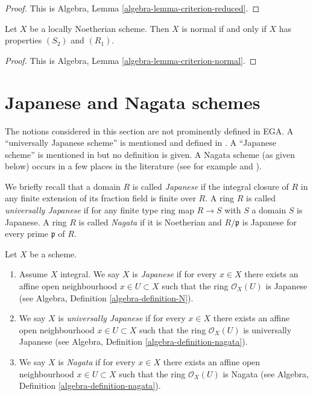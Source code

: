 \begin{proof}
This is Algebra, Lemma \ref{algebra-lemma-criterion-reduced}.
\end{proof}

\begin{lemma}
\label{lemma-criterion-normal}
Let $X$ be a locally Noetherian scheme.
Then $X$ is normal if and only if $X$ has properties $(S_2)$ and $(R_1)$.
\end{lemma}

\begin{proof}
This is Algebra, Lemma \ref{algebra-lemma-criterion-normal}.
\end{proof}






\section{Japanese and Nagata schemes}
\label{section-nagata}

\noindent
The notions considered in this section are not prominently defined in EGA.
A ``universally Japanese scheme'' is mentioned and defined in
\cite[IV Corollary 5.11.4]{EGA}. A ``Japanese scheme'' is mentioned in
\cite[IV Remark 10.4.14 (ii)]{EGA} but no definition is given.
A Nagata scheme (as given below) occurs in a few
places in the literature (see for example \cite[Definition 8.2.30]{Liu} and
\cite[Page 142]{Greco}).

\medskip\noindent
We briefly recall that a domain $R$ is called {\it Japanese} if the integral
closure of $R$ in any finite extension of its fraction field is finite over
$R$. A ring $R$ is called {\it universally Japanese} if for any finite type
ring map $R \to S$ with $S$ a domain $S$ is Japanese. A ring $R$ is called
{\it Nagata} if it is Noetherian and $R/\mathfrak p$ is Japanese for every
prime $\mathfrak p$ of $R$.

\begin{definition}
\label{definition-nagata}
Let $X$ be a scheme.
\begin{enumerate}
\item Assume $X$ integral. We say $X$ is {\it Japanese}
if for every $x \in X$ there exists an
affine open neighbourhood $x \in U \subset X$ such that the ring
$\mathcal{O}_X(U)$ is Japanese (see
Algebra, Definition \ref{algebra-definition-N}).
\item We say $X$ is {\it universally Japanese} if for every $x \in X$
there exists an affine open neighbourhood $x \in U \subset X$ such that
the ring $\mathcal{O}_X(U)$ is universally Japanese (see
Algebra, Definition \ref{algebra-definition-nagata}).
\item We say $X$ is {\it Nagata} if for every $x \in X$ there exists an
affine open neighbourhood $x \in U \subset X$ such that the ring
$\mathcal{O}_X(U)$ is Nagata (see
Algebra, Definition \ref{algebra-definition-nagata}).
\end{enumerate}
\end{definition}

